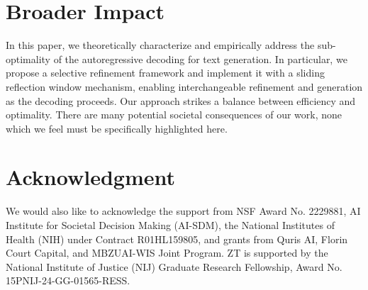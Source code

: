 \section*{Broader Impact}\label{sec:broader_impact}
In this paper, we theoretically characterize and empirically address the sub-optimality of the autoregressive decoding for text generation.
In particular, we propose a selective refinement framework and implement it with a sliding reflection window mechanism, enabling interchangeable refinement and generation as the decoding proceeds.
Our approach strikes a balance between efficiency and optimality.
There are many potential societal consequences of our work, none which we feel must be specifically highlighted here.

\section*{Acknowledgment}  %
We would also like to acknowledge the support from NSF Award No. 2229881, AI Institute for Societal Decision Making (AI-SDM), the National Institutes of Health (NIH) under Contract R01HL159805, and grants from Quris AI, Florin Court Capital, and MBZUAI-WIS Joint Program.
ZT is supported by the National Institute of Justice (NIJ) Graduate Research Fellowship, Award No. 15PNIJ-24-GG-01565-RESS.